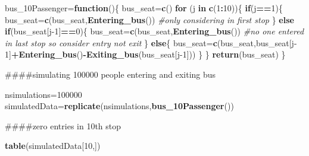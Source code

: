 \documentclass[
]{article}
\newenvironment{Shaded}{\begin{snugshade}}{\end{snugshade}}
\newcommand{\CommentTok}[1]{\textcolor[rgb]{0.56,0.35,0.01}{\textit{#1}}}
\newcommand{\ControlFlowTok}[1]{\textcolor[rgb]{0.13,0.29,0.53}{\textbf{#1}}}
\newcommand{\DecValTok}[1]{\textcolor[rgb]{0.00,0.00,0.81}{#1}}
\newcommand{\FunctionTok}[1]{\textcolor[rgb]{0.13,0.29,0.53}{\textbf{#1}}}
\newcommand{\NormalTok}[1]{#1}
\newcommand{\OtherTok}[1]{\textcolor[rgb]{0.56,0.35,0.01}{#1}}
\newcommand{\SpecialCharTok}[1]{\textcolor[rgb]{0.81,0.36,0.00}{\textbf{#1}}}
\begin{document}
\begin{Shaded}
\begin{Highlighting}[]
\NormalTok{bus\_10Passenger}\OtherTok{=}\ControlFlowTok{function}\NormalTok{()\{}
\NormalTok{  bus\_seat}\OtherTok{=}\FunctionTok{c}\NormalTok{()}
  \ControlFlowTok{for}\NormalTok{ (j }\ControlFlowTok{in} \FunctionTok{c}\NormalTok{(}\DecValTok{1}\SpecialCharTok{:}\DecValTok{10}\NormalTok{))\{}
    \ControlFlowTok{if}\NormalTok{(j}\SpecialCharTok{==}\DecValTok{1}\NormalTok{)\{}
\NormalTok{      bus\_seat}\OtherTok{=}\FunctionTok{c}\NormalTok{(bus\_seat,}\FunctionTok{Entering\_bus}\NormalTok{())       }\CommentTok{\#only considering in first stop}
\NormalTok{    \}}
    \ControlFlowTok{else} \ControlFlowTok{if}\NormalTok{(bus\_seat[j}\DecValTok{{-}1}\NormalTok{]}\SpecialCharTok{==}\DecValTok{0}\NormalTok{)\{        }
\NormalTok{      bus\_seat}\OtherTok{=}\FunctionTok{c}\NormalTok{(bus\_seat,}\FunctionTok{Entering\_bus}\NormalTok{())  }\CommentTok{\#no one entered in last stop so consider entry not exit}
\NormalTok{    \}}
    \ControlFlowTok{else}\NormalTok{\{                      }
\NormalTok{      bus\_seat}\OtherTok{=}\FunctionTok{c}\NormalTok{(bus\_seat,bus\_seat[j}\DecValTok{{-}1}\NormalTok{]}\SpecialCharTok{+}\FunctionTok{Entering\_bus}\NormalTok{()}\SpecialCharTok{{-}}\FunctionTok{Exiting\_bus}\NormalTok{(bus\_seat[j}\DecValTok{{-}1}\NormalTok{]))}
\NormalTok{    \}}
\NormalTok{  \}}
  \FunctionTok{return}\NormalTok{(bus\_seat)}
\NormalTok{\}}
\end{Highlighting}
\end{Shaded}

\#\#\#\#simulating 100000 people entering and exiting bus

\begin{Shaded}
\begin{Highlighting}[]
\NormalTok{nsimulations}\OtherTok{=}\DecValTok{100000}
\NormalTok{simulatedData}\OtherTok{=}\FunctionTok{replicate}\NormalTok{(nsimulations,}\FunctionTok{bus\_10Passenger}\NormalTok{())}
\end{Highlighting}
\end{Shaded}

\#\#\#\#zero entries in 10th stop

\begin{Shaded}
\begin{Highlighting}[]
\FunctionTok{table}\NormalTok{(simulatedData[}\DecValTok{10}\NormalTok{,])}
\end{Highlighting}
\end{Shaded}
\end{document}
